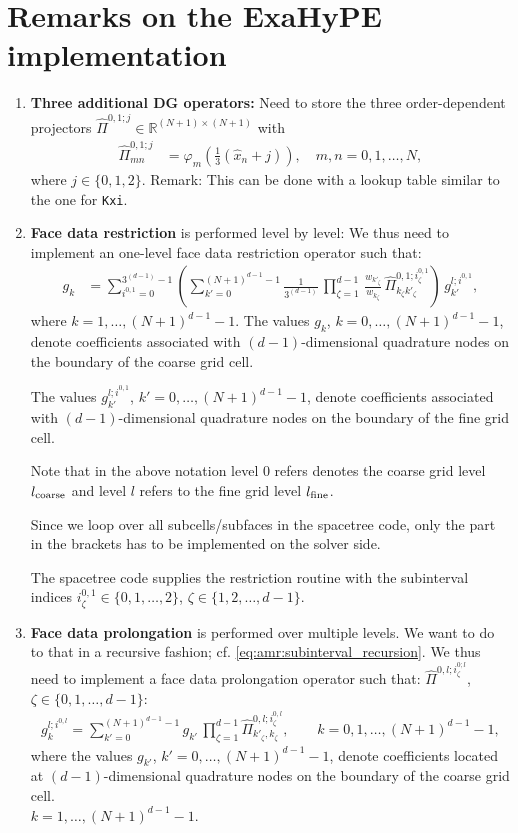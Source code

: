 \documentclass{scrreprt}
\theoremstyle{definition}
\theoremstyle{nonumberplain}
\begin{document}
\section{Remarks on the ExaHyPE implementation}
\begin{enumerate}
  \item \textbf{Three additional DG operators:} Need to store the three
  order-dependent projectors $\hat{\Pi}^{0,1;j}\in\mathbb{R}^{(N+1)\times(N+1)}$
with
\begin{align}
\hat{\Pi}^{0,1;j}_{mn}
&=
\varphi_m \left( \frac{1}{3} (\hat{x}_n+j)\right),
\quad m,n=0,1,\ldots,N,
\end{align}
where $j\in\{0,1,2\}$.
Remark: This can be done with a lookup table similar to the one for \texttt{Kxi}.
\item \textbf{Face data restriction} is performed level by level: We thus
need to implement an one-level face data restriction operator such that:
\begin{align}
g_k &=
\sum_{i^{0,1}=0}^{3^{(d-1)}-1}
\left(
\sum_{k'=0}^{(N+1)^{d-1}-1}
\frac{1}{3^{(d-1)}}\,
\prod_{\zeta=1}^{d-1}\,
\frac{w_{k'_\zeta}}{w_{k_\zeta}}\,
\hat{\Pi}^{0,1;i^{0,1}_\zeta}_{k_\zeta k'_\zeta}
\right)
\,
g^{l;i^{0,1}}_{k'}
,
\end{align}
where $k=1,\ldots,(N+1)^{d-1}-1$.
The values $g_{k}$, $k=0,\ldots,(N+1)^{d-1}-1$, denote coefficients
associated with $(d-1)$-dimensional quadrature nodes on the boundary
of the coarse grid cell.

The values $g^{l;i^{0,1}}_{k'}$, $k'=0,\ldots,(N+1)^{d-1}-1$, denote
coefficients associated with $(d-1)$-dimensional quadrature nodes on the boundary
of the fine grid cell. 

Note that in the above notation level 0 refers
denotes the coarse grid level $l_\textup{coarse}$ and level $l$ refers to
the fine grid level $l_\textup{fine}$.

Since we loop over all subcells/subfaces in
the spacetree code, only the part in
the brackets has to be implemented on the solver side.

The spacetree code supplies the restriction
routine with the subinterval indices
$i^{0,1}_\zeta\in\{0,1,\ldots,2\}$, $\zeta\in\{1,2,\ldots,d-1\}$.
\item \textbf{Face data prolongation} is performed over multiple levels.
We want to do to that in a recursive fashion; cf.
\eqref{eq:amr:subinterval_recursion}.
We thus need to implement a face data prolongation operator such that:
$\hat{\Pi}^{0,l;i^{0;l}_\zeta}$, $\zeta\in\{0,1,\ldots,d-1\}$:
\begin{align}
g^{l;i^{0,l}}_k = \sum_{k'=0}^{(N+1)^{d-1}-1} g_{k'}\,\prod_{\zeta=1}^{d-1}
\hat{\Pi}^{0,l;i^{0,l}_\zeta}_{k'_\zeta,k_\zeta},\qquad k = 0,1,\ldots,(N+1)^{d-1}-1,
\end{align}
where the values $g_{k'}$, $k'=0,\ldots,(N+1)^{d-1}-1$, denote coefficients
located at $(d-1)$-dimensional quadrature nodes on the boundary
of the coarse grid cell.
\\ 
${k=1,\ldots,(N+1)^{d-1}-1}$.


\end{enumerate}
\end{document}
